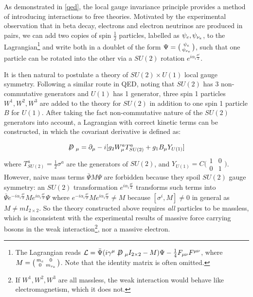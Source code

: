 As demonstrated in \cref{qed}, the local gauge invariance principle provides a
method of introducing interactions to free theories.
Motivated by the experimental observation that in beta decay, electrons and
electron neutrinos are produced in pairs,
we can add two copies of spin $\frac{1}{2}$ particles,
labelled as $\psi_e, \psi_{{\nu}_e}$,
to the Lagrangian\footnote{
    The Lagrangian reads
    $\mathcal{L} = \bar{\Psi} (i \gamma^\mu \fsl{D}_\mu I_{2 \times 2} - M)\Psi -
    \frac{1}{4} F_{\mu\nu}F^{\mu\nu}$,
    where $M = \bigl(\begin{smallmatrix} m_e & 0 \\ 0 & m_{{\nu}_e} \end{smallmatrix}\bigr)$.
    Note that the identity matrix is often omitted.
} and write both in a doublet
of the form
$\Psi = \bigl(\begin{smallmatrix} \psi_e \\ \psi_{{\nu}_e} \end{smallmatrix}\bigr)$,
such that one particle can be rotated into the other via a $SU(2)$ rotation
$e^{i \alpha_i \frac{\sigma^i}{2}}$.

It is then natural to postulate a theory of $SU(2) \times U(1)$ local gauge
symmetry.
Following a similar route in QED,
noting that $SU(2)$ has 3 non-commutative generators and $U(1)$ has 1 generator,
three spin 1 particles $W^1, W^2, W^3$ are added to the theory for $SU(2)$ in
addition to one spin 1 particle $B$ for $U(1)$.
After taking the fact non-commutative nature of the $SU(2)$ generators into
account,
a Lagrangian with correct kinetic terms can be constructed,
in which the covariant derivative is defined as:

\begin{equation}
    \fsl{D}_\mu = \partial_\mu - i[g_2 W_\mu^a T^a_{SU(2)} + g_1 B_\mu Y_{U(1)}]
\end{equation}
where $T^a_{SU(2)} = \frac{1}{2} \sigma^a$ are the generators of $SU(2)$,
and
$Y_{U(1)} = C \bigl(\begin{smallmatrix} 1 & 0 \\ 0 & 1 \end{smallmatrix}\bigr)$.
However, naive mass terms $\bar{\Psi} M \Psi$ are forbidden because they
spoil $SU(2)$ gauge symmetry:
an $SU(2)$ transformation $e^{i \alpha_i \frac{\sigma^i}{2}}$ transforms
such terms into
$\bar{\Psi} e^{-i \alpha_i \frac{\sigma^i}{2}} M e^{i \alpha_i \frac{\sigma^i}{2}} \Psi$
where $e^{-i \alpha_i \frac{\sigma^i}{2}} M e^{i \alpha_i \frac{\sigma^i}{2}} \neq M$
because $[\sigma^i, M] \neq 0$ in general as $M \neq m I_{2 \times 2}$.
So the theory constructed above requires \emph{all} particles to be massless,
which is inconsistent with the experimental results of massive force carrying
bosons in the weak interaction\footnote{
    If $W^1, W^2, W^3$ are all massless, the weak interaction would behave like
    electromagnetism, which it does not.
}, nor a massive electron.

